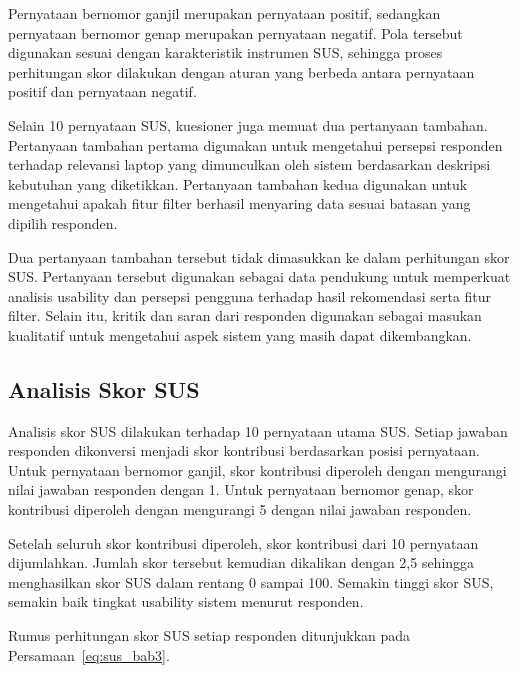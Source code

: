 Pernyataan bernomor ganjil merupakan pernyataan positif, sedangkan pernyataan bernomor genap merupakan pernyataan negatif. Pola tersebut digunakan sesuai dengan karakteristik instrumen SUS, sehingga proses perhitungan skor dilakukan dengan aturan yang berbeda antara pernyataan positif dan pernyataan negatif.

Selain 10 pernyataan SUS, kuesioner juga memuat dua pertanyaan tambahan. Pertanyaan tambahan pertama digunakan untuk mengetahui persepsi responden terhadap relevansi laptop yang dimunculkan oleh sistem berdasarkan deskripsi kebutuhan yang diketikkan. Pertanyaan tambahan kedua digunakan untuk mengetahui apakah fitur filter berhasil menyaring data sesuai batasan yang dipilih responden.

Dua pertanyaan tambahan tersebut tidak dimasukkan ke dalam perhitungan skor SUS. Pertanyaan tersebut digunakan sebagai data pendukung untuk memperkuat analisis usability dan persepsi pengguna terhadap hasil rekomendasi serta fitur filter. Selain itu, kritik dan saran dari responden digunakan sebagai masukan kualitatif untuk mengetahui aspek sistem yang masih dapat dikembangkan.

\subsection{Analisis Skor SUS}
Analisis skor SUS dilakukan terhadap 10 pernyataan utama SUS. Setiap jawaban responden dikonversi menjadi skor kontribusi berdasarkan posisi pernyataan. Untuk pernyataan bernomor ganjil, skor kontribusi diperoleh dengan mengurangi nilai jawaban responden dengan 1. Untuk pernyataan bernomor genap, skor kontribusi diperoleh dengan mengurangi 5 dengan nilai jawaban responden.

Setelah seluruh skor kontribusi diperoleh, skor kontribusi dari 10 pernyataan dijumlahkan. Jumlah skor tersebut kemudian dikalikan dengan 2,5 sehingga menghasilkan skor SUS dalam rentang 0 sampai 100. Semakin tinggi skor SUS, semakin baik tingkat usability sistem menurut responden.

Rumus perhitungan skor SUS setiap responden ditunjukkan pada Persamaan~\ref{eq:sus_bab3}.



